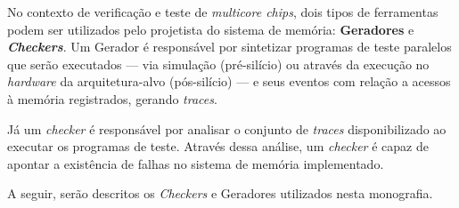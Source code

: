 
No contexto de verificação e teste de \textit{multicore chips}, dois tipos de
ferramentas podem ser utilizados pelo projetista do sistema de memória:
\textbf{Geradores} e \textbf{\textit{Checkers}}. Um Gerador é responsável por
sintetizar programas de teste paralelos que serão executados --- via simulação
(pré-silício) ou através da execução no \textit{hardware} da arquitetura-alvo
(pós-silício) --- e seus eventos com relação a acessos à memória registrados,
gerando \textit{traces}.

Já um \textit{checker} é responsável por analisar o conjunto de \textit{traces}
disponibilizado ao executar os programas de teste. Através dessa análise, um
\textit{checker} é capaz de apontar a existência de falhas no sistema de
memória implementado.

A seguir, serão descritos os \textit{Checkers} e Geradores utilizados nesta
monografia.

